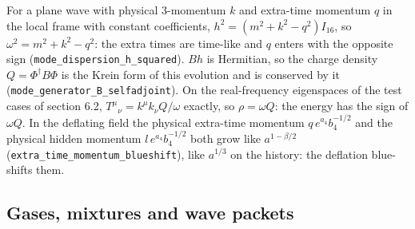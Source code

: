 \documentclass[11pt]{article}
\begin{document}
For a plane wave with physical 3-momentum $k$ and extra-time momentum $q$ in the local frame with constant coefficients, $h^2 = (m^2 + k^2 - q^2)I_{16}$, so $\omega^2 = m^2 + k^2 - q^2$: the extra times are time-like and $q$ enters with the opposite sign (\texttt{mode\_dis\allowbreak{}persion\_\allowbreak{}h\_square\allowbreak{}d}). $Bh$ is Hermitian, so the charge density $Q = \Phi^\dagger B\Phi$ is the Krein form of this evolution and is conserved by it (\texttt{mode\_gen\allowbreak{}erator\_B\allowbreak{}\_selfadj\allowbreak{}oint}). On the real-frequency eigenspaces of the test cases of section 6.2, $T^\mu{}_\nu = k^\mu k_\nu Q/\omega$ exactly, so $\rho = \omega Q$: the energy has the sign of $\omega Q$. In the deflating field the physical extra-time momentum $q\,e^{a_4}b_4^{-1/2}$ and the physical hidden momentum $l\,e^{a_4}b_4^{-1/2}$ both grow like $a^{1 - \beta/2}$ (\texttt{extra\_ti\allowbreak{}me\_momen\allowbreak{}tum\_blue\allowbreak{}shift}), like $a^{1/3}$ on the history: the deflation blue-shifts them.

\subsection{Gases, mixtures and wave packets}
\end{document}
